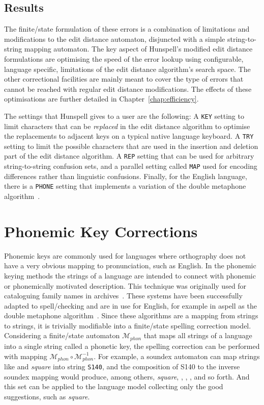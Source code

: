\documentclass[officiallayout,final]{unihelcompling}
\newcommand\misspelt{\bgroup\markoverwith
{\textcolor{red}{\lower3.5pt\hbox{\sixly \char58}}}\ULon}
\begin{document}
\subsection{Results}

The finite\-/state formulation of these errors is a combination of limitations
and modifications to the edit distance automaton, disjuncted with a simple
string-to-string mapping automaton. The key aspect of Hunspell's modified edit
distance formulations are optimising the speed of the error lookup using
configurable, language specific, limitations of the edit distance algorithm's
search space. The other correctional facilities are mainly meant to cover the
type of errors that cannot be reached with regular edit distance modifications.
The effects of these optimisations are further detailed in
Chapter~\ref{chap:efficiency}.

The settings that Hunspell gives to a user are the following: A \texttt{KEY}
setting to limit characters that can be \emph{replaced} in the edit distance
algorithm to optimise the replacements to adjacent keys on a typical native
language keyboard. A \texttt{TRY} setting to limit the possible characters
that are used in the insertion and deletion part of the edit distance
algorithm. A \texttt{REP} setting that can be used for arbitrary
string-to-string confusion sets, and a parallel setting called \texttt{MAP}
used for encoding differences rather than linguistic confusions.  Finally, for
the English language, there is a \texttt{PHONE} setting that implements a
variation of the double metaphone algorithm~\citep{philips2000double}.

\section{Phonemic Key Corrections}
\label{sec:phonemic}

Phonemic keys are commonly used for languages where orthography does not have a
very obvious mapping to pronunciation, such as English. In the phonemic keying
methods the strings of a language are intended to connect with phonemic or
phonemically motivated description. This technique was originally used for
cataloguing family names in archives~\citep{russell1918soundex}. These systems
have been successfully adapted to spell\-/checking and are in use for English,
for example in aspell as the double metaphone
algorithm~\citep{philips2000double}.  Since these algorithms are a mapping from
strings to strings, it is trivially modifiable into a finite\-/state spelling
correction model. Considering a finite\-/state automaton $\mathcal{M}_{phon}$
that maps all strings of a language into a single string called a phonetic key,
the spelling correction can be performed with mapping $\mathcal{M}_{phon} \circ
\mathcal{M}_{phon}^{-1}$.  For example, a soundex automaton can map strings
like \misspelt{squer} and \emph{square} into string \texttt{S140}, and the
composition of S140 to the inverse soundex mapping would produce, among
others, \emph{square}, \misspelt{squer}, \misspelt{sqr}, \misspelt{sqrrr}, and
so forth. And this set can be applied to the language model collecting only the
good suggestions, such as \emph{square}.
\end{document}
